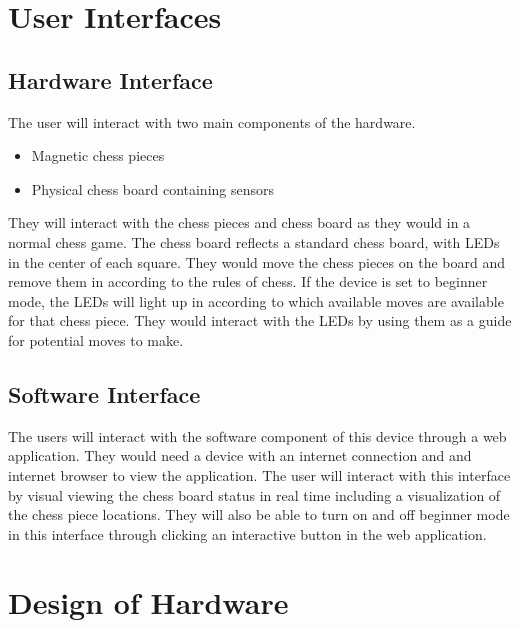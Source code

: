 \documentclass[12pt, titlepage]{article}
\begin{document}
\section{User Interfaces}

\subsection{Hardware Interface}
The user will interact with two main components of the hardware.
\begin{itemize}
  \item Magnetic chess pieces
  \item Physical chess board containing sensors
\end{itemize}
They will interact with the chess pieces and chess board as they would in a normal chess game. The chess board reflects a standard chess board, with 
LEDs in the center of each square. They would move the chess pieces on the board and remove them in according to the rules of chess. If the device
is set to beginner mode, the LEDs will light up in according to which available moves are available for that chess piece. They would interact with the LEDs
by using them as a guide for potential moves to make.

\subsection{Software Interface}
The users will interact with the software component of this device through a web application. They would need a device with an internet connection and and internet browser
to view the application. The user will interact with this interface by visual viewing the chess board status in real time including a visualization of the chess piece locations.
They will also be able to turn on and off beginner mode in this interface through clicking an interactive button in the web application. 

\section{Design of Hardware}
\end{document}
